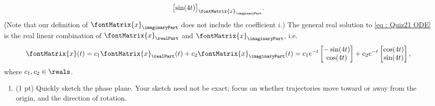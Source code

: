 {\begin{align*}
{\begin{bmatrix}
\sin(4 t)
\end{bmatrix}%
}_{\fontMatrix{x}_{\imaginaryPart}}.
\end{align*}
(Note that our definition of $\fontMatrix{x}_{\imaginaryPart}$ does not include the coefficient $i$.) The general real solution to \eqref{eq : Quiz21 ODE} is the real linear combination of $\fontMatrix{x}_{\realPart}$ and $\fontMatrix{x}_{\imaginaryPart}$, i.e.
\begin{align*}
\fontMatrix{x}(t)
=
c_{1} \fontMatrix{x}_{\realPart}(t) + c_{2} \fontMatrix{x}_{\imaginaryPart}(t)
=
c_{1} e^{-t}
\begin{bmatrix}%
-\sin(4 t)	\\
\cos(4 t)
\end{bmatrix}%
+
c_{2} e^{-t}
\begin{bmatrix}%
\cos(4 t)	\\
\sin(4 t)
\end{bmatrix}%
,
\end{align*}
where $c_{1},c_{2} \in \reals$.}%

\begin{enumerate}[resume,label=(\alph*)]
\item (1 pt) Quickly sketch the phase plane. Your sketch need not be exact; focus on whether trajectories move toward or away from the origin, and the direction of rotation.
\end{enumerate}

